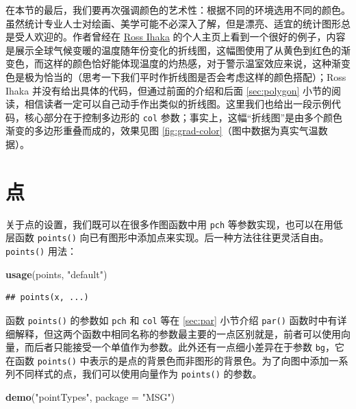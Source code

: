 \documentclass[
  b5paper,
  UTF8,twoside]{book}
\newenvironment{Shaded}{\begin{snugshade}}{\end{snugshade}}
\newcommand{\AttributeTok}[1]{\textcolor[rgb]{0.13,0.29,0.53}{#1}}
\newcommand{\FunctionTok}[1]{\textcolor[rgb]{0.13,0.29,0.53}{\textbf{#1}}}
\newcommand{\NormalTok}[1]{#1}
\newcommand{\StringTok}[1]{\textcolor[rgb]{0.31,0.60,0.02}{#1}}
\begin{document}
在本节的最后，我们要再次强调颜色的艺术性：根据不同的环境选用不同的颜色。虽然统计专业人士对绘画、美学可能不必深入了解，但是漂亮、适宜的统计图形总是受人欢迎的。作者曾经在 \href{https://www.stat.auckland.ac.nz/~ihaka/}{Ross Ihaka} 的个人主页上看到一个很好的例子，内容是展示全球气候变暖的温度随年份变化的折线图，这幅图使用了从黄色到红色的渐变色，而这样的颜色恰好能体现温度的灼热感，对于警示温室效应来说，这种渐变色是极为恰当的（思考一下我们平时作折线图是否会考虑这样的颜色搭配）；Ross Ihaka 并没有给出具体的代码，但通过前面的介绍和后面 \ref{sec:polygon} 小节的阅读，相信读者一定可以自己动手作出类似的折线图。这里我们也给出一段示例代码，核心部分在于控制多边形的 \texttt{col} 参数；事实上，这幅``折线图''是由多个颜色渐变的多边形重叠而成的，效果见图 \ref{fig:grad-color}（图中数据为真实气温数据）。

\section{点}\label{sec:points}

关于点的设置，我们既可以在很多作图函数中用 \texttt{pch} 等参数实现，也可以在用低层函数 \texttt{points()} 向已有图形中添加点来实现。后一种方法往往更灵活自由。\texttt{points()} 用法：

\begin{Shaded}
\begin{Highlighting}[]
\FunctionTok{usage}\NormalTok{(points, }\StringTok{"default"}\NormalTok{)}
\end{Highlighting}
\end{Shaded}

\begin{verbatim}
## points(x, ...)
\end{verbatim}

函数 \texttt{points()} 的参数如 \texttt{pch} 和 \texttt{col} 等在 \ref{sec:par} 小节介绍 \texttt{par()} 函数时中有详细解释，但这两个函数中相同名称的参数最主要的一点区别就是，前者可以使用向量，而后者只能接受一个单值作为参数。此外还有一点细小差异在于参数 \texttt{bg}，它在函数 \texttt{points()} 中表示的是点的背景色而非图形的背景色。为了向图中添加一系列不同样式的点，我们可以使用向量作为 \texttt{points()} 的参数。

\begin{Shaded}
\begin{Highlighting}[]
\FunctionTok{demo}\NormalTok{(}\StringTok{"pointTypes"}\NormalTok{, }\AttributeTok{package =} \StringTok{"MSG"}\NormalTok{)}
\end{Highlighting}
\end{Shaded}
\end{document}
